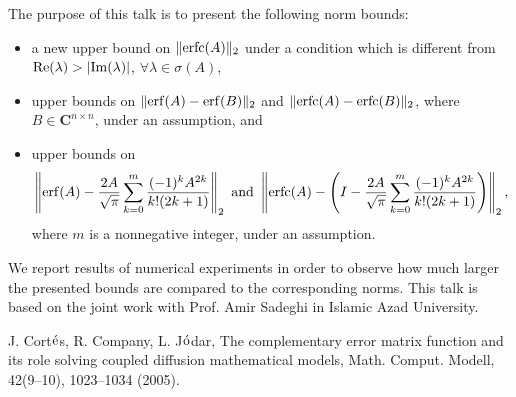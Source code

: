 \documentclass[ILAS2025-program.tex]{subfiles}
\begin{document}
\begin{ilasabstract}
\begin{bibunit}
The purpose of this talk is to present the following norm bounds: 
\begin{itemize}
\item a new upper bound on $\|{\rm erfc}(A)\|_2$ under a condition which is different from ${\rm Re}(\lambda) > |{\rm Im}(\lambda)|$, $\forall \lambda \in \sigma(A)$, 
\item upper bounds on $\|{\rm erf}(A) - {\rm erf}(B)\|_2$ and $\|{\rm erfc}(A) - {\rm erfc}(B)\|_2$, where $B \in \mathbf{C}^{n \times n}$, under an assumption, and 
\item upper bounds on 
$$
\left\|{\rm erf}(A) - \frac{2A}{\sqrt{\pi}}\sum_{k=0}^{m}\frac{(-1)^k A^{2k}}{k! (2k+1)}\right\|_2 \ \text{and} \ 
\left\|{\rm erfc}(A) - \left(I - \frac{2A}{\sqrt{\pi}}\sum_{k=0}^{m}\frac{(-1)^kA^{2k}}{k!(2k+1)}\right)\right\|_2,
$$ 
where $m$ is a nonnegative integer, under an assumption. 
\end{itemize}
We report results of numerical experiments in order to observe how much larger the presented bounds are compared to the corresponding norms. 
This talk is based on the joint work with Prof. Amir Sadeghi in Islamic Azad University. 

\begin{thebibliography}{5}
J. Cort$\acute{{\rm e}}$s, R. Company, L. J$\acute{{\rm o}}$dar, 
The complementary error matrix function and its role solving coupled diffusion mathematical models, 
Math. Comput. Modell, 42(9--10), 1023--1034 (2005). 
\end{thebibliography}
        \end{bibunit}
        
\end{ilasabstract}
    
\end{document}
